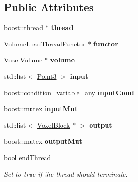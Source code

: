\subsection*{\-Public \-Attributes}
\begin{DoxyCompactItemize}
\item 
\hypertarget{classVolumeLoadThread_ab4c16e2b23e25727061754b8bdf4a553}{
boost\-::thread $\ast$ {\bfseries thread}}
\label{d0/d8a/classVolumeLoadThread_ab4c16e2b23e25727061754b8bdf4a553}

\item 
\hypertarget{classVolumeLoadThread_a9b7fc692da17da80491ec7157c83fa23}{
\hyperlink{classVolumeLoadThreadFunctor}{\-Volume\-Load\-Thread\-Functor} $\ast$ {\bfseries functor}}
\label{d0/d8a/classVolumeLoadThread_a9b7fc692da17da80491ec7157c83fa23}

\item 
\hypertarget{classVolumeLoadThread_ada9135fc5fcf5098f21da9ef79515e74}{
\hyperlink{classVoxelVolume}{\-Voxel\-Volume} $\ast$ {\bfseries volume}}
\label{d0/d8a/classVolumeLoadThread_ada9135fc5fcf5098f21da9ef79515e74}

\item 
\hypertarget{classVolumeLoadThread_a33a31693d958b90b69bbcc2526c57765}{
std\-::list$<$ \hyperlink{classPoint3}{\-Point3} $>$ {\bfseries input}}
\label{d0/d8a/classVolumeLoadThread_a33a31693d958b90b69bbcc2526c57765}

\item 
\hypertarget{classVolumeLoadThread_ab6967a6d8e15c7a5cd8882641800a8ac}{
boost\-::condition\-\_\-variable\-\_\-any {\bfseries input\-Cond}}
\label{d0/d8a/classVolumeLoadThread_ab6967a6d8e15c7a5cd8882641800a8ac}

\item 
\hypertarget{classVolumeLoadThread_a6a933d0130e238f31a4564f3e396bca0}{
boost\-::mutex {\bfseries input\-Mut}}
\label{d0/d8a/classVolumeLoadThread_a6a933d0130e238f31a4564f3e396bca0}

\item 
\hypertarget{classVolumeLoadThread_aae7bb07877234cd256f55dccac38e7e6}{
std\-::list$<$ \hyperlink{classVoxelBlock}{\-Voxel\-Block} $\ast$ $>$ {\bfseries output}}
\label{d0/d8a/classVolumeLoadThread_aae7bb07877234cd256f55dccac38e7e6}

\item 
\hypertarget{classVolumeLoadThread_ac86e7a66edd98eb50d9d4aa3e7330a9e}{
boost\-::mutex {\bfseries output\-Mut}}
\label{d0/d8a/classVolumeLoadThread_ac86e7a66edd98eb50d9d4aa3e7330a9e}

\item 
\hypertarget{classVolumeLoadThread_adde87c70b541727209743e90cc13ec7c}{
bool \hyperlink{classVolumeLoadThread_adde87c70b541727209743e90cc13ec7c}{end\-Thread}}
\label{d0/d8a/classVolumeLoadThread_adde87c70b541727209743e90cc13ec7c}

\begin{DoxyCompactList}\small\item\em \-Set to true if the thread should terminate. \end{DoxyCompactList}\end{DoxyCompactItemize}


